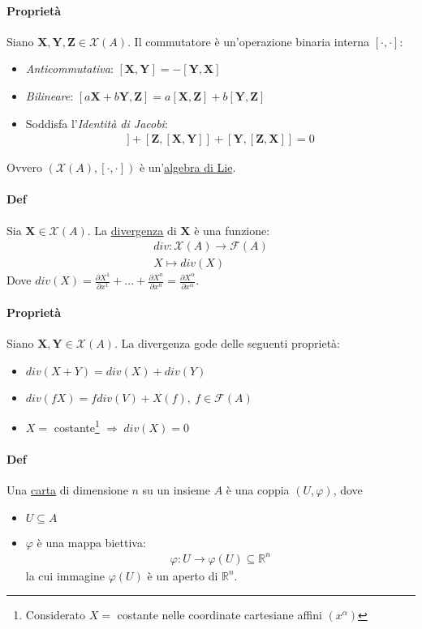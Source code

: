    \paragraph{Proprietà} Siano $\mathbf{X},\mathbf{Y},\mathbf{Z}\in \mathcal{X}(A)$. Il commutatore è un'operazione binaria interna $[\cdot,\cdot]$:
    \begin{itemize}
        \item \textit{Anticommutativa}: $[\mathbf{X},\mathbf{Y}]=-[\mathbf{Y},\mathbf{X}]$
        \item \textit{Bilineare}:
    $[a\mathbf{X}+b\mathbf{Y},\mathbf{Z}]=a[\mathbf{X},\mathbf{Z}]+b[\mathbf{Y},\mathbf{Z}]$
    \item Soddisfa l'\textit{Identità di Jacobi}:
    \begin{align*}
        [\mathbf{X},[\mathbf{Y},\mathbf{Z}]]+[\mathbf{Z},[\mathbf{X},\mathbf{Y}]]+[\mathbf{Y},[\mathbf{Z},\mathbf{X}]]=0
    \end{align*}
    \end{itemize}
    Ovvero $(\mathcal{X}(A),[\cdot,\cdot])$ è un'\underline{algebra di Lie}.
\paragraph{Def} Sia $\mathbf{X}\in \mathcal{X}(A)$. La \underline{divergenza} di $\mathbf{X}$ è una funzione:
\begin{align*}div\colon\mathcal{X}(A)\to \mathcal{F}(A)\\
     X\mapsto div(X)
    \end{align*}
    Dove $div(X)=\frac{\partial X^1}{\partial x^1}+...+\frac{\partial X^n}{\partial x^n}=\frac{\partial X^\alpha}{\partial x^\alpha}$.

\paragraph{Proprietà} Siano $\mathbf{X},\mathbf{Y}\in \mathcal{X}(A)$. La divergenza gode delle seguenti proprietà:
\begin{itemize}
    \item $div(X+Y)=div(X)+div(Y)$
    \item $div(fX)=fdiv(V)+ X(f),\: f\in \mathcal{F}(A)$
    \item $X=$ costante\footnote{Considerato $X=$ costante nelle coordinate cartesiane affini $(x^\alpha)$} $\Rightarrow \: div(X)=0$
\end{itemize}
\paragraph{Def} Una \underline{carta} di dimensione $n$ su un insieme $A$ è una coppia $(U,\varphi)$, dove 
\begin{itemize}
    \item $U\subseteq A$  
    \item $\varphi$ è una mappa biettiva:
    \begin{align*}
        \varphi\colon U\to \varphi(U)\subseteq \mathbb{R}^n
    \end{align*}
    la cui immagine $\varphi(U)$ è un aperto di $\mathbb{R}^n$.
\end{itemize}

